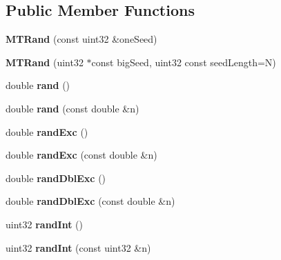 \subsection*{Public Member Functions}
\begin{DoxyCompactItemize}
\item 
\hypertarget{class_m_t_rand_ab4f392e44228a583b7b1a3f036fb2fd0}{
{\bfseries MTRand} (const uint32 \&oneSeed)}
\label{class_m_t_rand_ab4f392e44228a583b7b1a3f036fb2fd0}

\item 
\hypertarget{class_m_t_rand_a380e79e0192b46426abcefa6e2dd082e}{
{\bfseries MTRand} (uint32 $\ast$const bigSeed, uint32 const seedLength=N)}
\label{class_m_t_rand_a380e79e0192b46426abcefa6e2dd082e}

\item 
\hypertarget{class_m_t_rand_a76d129a2d850c24ff4a0613f299cf3a5}{
double {\bfseries rand} ()}
\label{class_m_t_rand_a76d129a2d850c24ff4a0613f299cf3a5}

\item 
\hypertarget{class_m_t_rand_a7a47382fb7b19ae1f330691735dc800b}{
double {\bfseries rand} (const double \&n)}
\label{class_m_t_rand_a7a47382fb7b19ae1f330691735dc800b}

\item 
\hypertarget{class_m_t_rand_afd05e468983b3a3d66ce0f403bd666af}{
double {\bfseries randExc} ()}
\label{class_m_t_rand_afd05e468983b3a3d66ce0f403bd666af}

\item 
\hypertarget{class_m_t_rand_a2955abdb96e6cab97e50ac755d48dad1}{
double {\bfseries randExc} (const double \&n)}
\label{class_m_t_rand_a2955abdb96e6cab97e50ac755d48dad1}

\item 
\hypertarget{class_m_t_rand_a4d3a475aa72fe6d1a6d7d9e16d6a732e}{
double {\bfseries randDblExc} ()}
\label{class_m_t_rand_a4d3a475aa72fe6d1a6d7d9e16d6a732e}

\item 
\hypertarget{class_m_t_rand_a587c90f52c35fa2bf05d34791dd5457e}{
double {\bfseries randDblExc} (const double \&n)}
\label{class_m_t_rand_a587c90f52c35fa2bf05d34791dd5457e}

\item 
\hypertarget{class_m_t_rand_ad1008efd4fe0e8aae30459c2c58cfe35}{
uint32 {\bfseries randInt} ()}
\label{class_m_t_rand_ad1008efd4fe0e8aae30459c2c58cfe35}

\item 
\hypertarget{class_m_t_rand_a18ea21f615df06c9359c34d2eba6f252}{
uint32 {\bfseries randInt} (const uint32 \&n)}
\label{class_m_t_rand_a18ea21f615df06c9359c34d2eba6f252}


\end{DoxyCompactItemize}
